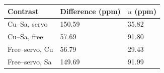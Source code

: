 \begin{tabular}{lll}
\toprule
Contrast & Difference (ppm) & $u$ (ppm) \\
\midrule
Cu--Sa, servo & 150.59 & 35.82 \\
Cu--Sa, free & 57.69 & 91.80 \\
Free--servo, Cu & 56.79 & 29.43 \\
Free--servo, Sa & 149.69 & 91.99 \\
\bottomrule
\end{tabular}
